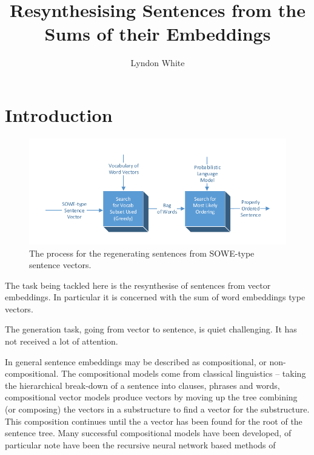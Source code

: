 \documentclass[]{scrartcl}
\title{Resynthesising Sentences from the Sums of their Embeddings}
\author{Lyndon White}
\numberwithin{equation}{section}
\numberwithin{figure}{section}
\theoremstyle{plain}
\theoremstyle{definition}
\begin{document}
\maketitle

\begin{abstract}

\end{abstract}

\section{Introduction}


\begin{figure}
	\centering 
	\includegraphics{block_diagram}
	\caption{The process for the regenerating sentences from SOWE-type sentence vectors.}
	\label{block_diagram}
\end{figure}
The task being tackled here is the resynthesise of sentences from vector embeddings.
In particular it is concerned with the sum of word embeddings type vectors.


The generation task, going from vector to sentence, is quiet challenging.
It has not received a lot of attention.



In general sentence embeddings may be described as compositional, or non-compositional.
The compositional models come from classical linguistics -- taking the hierarchical  break-down of a sentence into clauses, phrases and words, compositional vector models produce vectors by moving up the tree combining (or composing) the vectors in a substructure to find a vector for the substructure. This composition continues until the a vector has been found for the root of the sentence tree. Many successful compositional models have been developed, of particular note have been the recursive neural network based methods of  \cite{socher2010PhraseEmbedding}%
\end{document}
